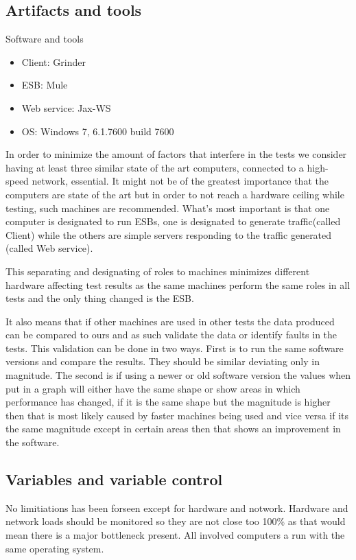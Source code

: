 \subsection{Artifacts and tools}
\begin{table}
	\caption{Software and tools}
	\begin{itemize}
		\item Client: Grinder \cite{whatisgrinder, kod}
		\item ESB: Mule \cite{whatismule, kod}
		\item Web service: Jax-WS \cite{whatisjaxws, kod}
		\item OS: Windows 7, 6.1.7600 build 7600
	\end{itemize}
\end{table}
In order to minimize the amount of factors that interfere in the tests we consider having at least three similar state of the art computers, connected to a high-speed network, essential.
It might not be of the greatest importance that the computers are state of the art but in order to not reach a hardware ceiling while testing, such machines are recommended. 
What's most important is that one computer is designated to run ESBs, one is designated to generate traffic(called Client) while the others are simple servers responding to the traffic generated (called Web service). 

This separating and designating of roles to machines minimizes different hardware affecting test results as the same machines perform the same roles in all tests and the only thing changed is the ESB. 

It also means that if other machines are used in other tests the data produced can be compared to ours and as such validate the data or identify faults in the tests. 
This validation can be done in two ways. 
First is to run the same software versions and compare the results. 
They should be similar deviating only in magnitude. The second is if using a newer or old software version the values when put in a graph will either have the same shape or show areas in which performance has changed, 
if it is the same shape but the magnitude is higher then that is most likely caused by faster machines being used and vice versa if its the same magnitude except in certain areas then that shows an improvement in the software.

\subsection{Variables and variable control}
No limitiations has been forseen except for hardware and notwork.
Hardware and network loads should be monitored so they are not close too 100\% as that would mean there is a major bottleneck present. 
All involved computers a run with the same operating system.
